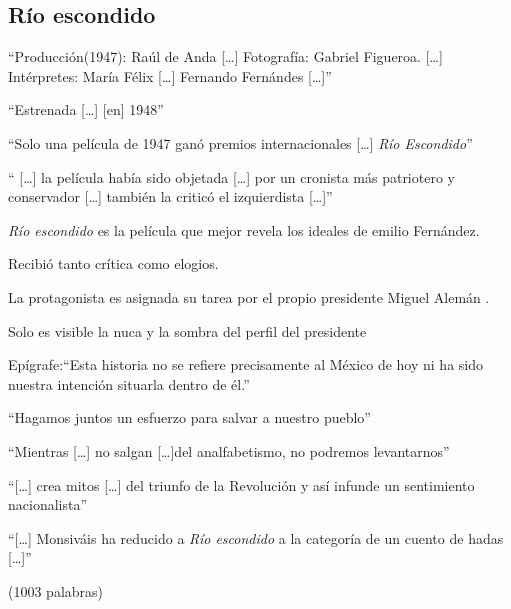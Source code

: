 \subsection{Río escondido}
    \begin{compactitem}
    \item ``Producción(1947): Raúl de Anda [\ldots] Fotografía: Gabriel Figueroa. [\ldots] Intérpretes: María Félix [\ldots] Fernando Fernándes [\ldots]''\autocite[143]{garcia_riera_historia_1993}
    \item ``Estrenada [\ldots] [en] 1948''\autocite[144]{garcia_riera_historia_1993}
    \item ``Solo una película de 1947 ganó premios internacionales [\ldots] \emph{Río Escondido}''\autocite[108-109]{garcia_riera_historia_1993}
    \item `` [\ldots] la película había sido objetada [\ldots] por un cronista más patriotero y conservador [\ldots] también la criticó el izquierdista [\ldots]''\autocite[144]{garcia_riera_historia_1993}%
    \item \emph{Río escondido} es la película que mejor revela los ideales de emilio Fernández\autocite[171]{mora_mexican_1978-2}.
    \item Recibió tanto crítica como elogios\autocite[170-171]{mora_mexican_1978-2}.
    \item La protagonista es asignada su tarea por el propio presidente Miguel Alemán \autocite[168]{mora_mexican_1978-2}.
    \item Solo es visible la nuca y la sombra del perfil del presidente \autocite[12:15-12:40]{fernandez_rio_1947}
    \item Epígrafe:``Esta historia no se refiere precisamente al México de hoy ni ha sido nuestra intención situarla dentro de él.''\autocite[00:00]{fernandez_rio_1947}
    \item ``Hagamos juntos un esfuerzo para salvar a nuestro pueblo''\autocite[12:51]{fernandez_rio_1947}
    \item ``Mientras [\ldots] no salgan [\ldots ]del analfabetismo, no podremos levantarnos''\autocite[12:27]{fernandez_rio_1947}
    \item ``[\ldots] crea mitos [\ldots] del triunfo de la Revolución y así infunde un sentimiento nacionalista''\autocite[66]{consuelo_rangel_ley_2006}
    \item ``[\ldots] Monsiváis ha reducido a  \emph{Río escondido} a la categoría de un cuento de hadas [\ldots]''\autocite[78]{blanco_aventura_1993}
    \end{compactitem} 

(1003 palabras)
\pagebreak

